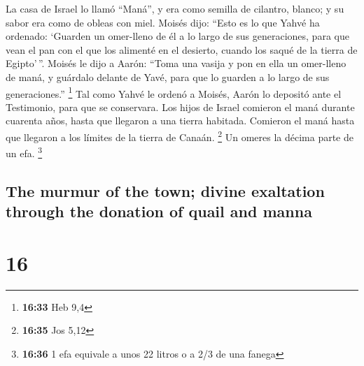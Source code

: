 \begin{paracol}{2}
 La casa de Israel lo llamó ``Maná'', y era como semilla
de cilantro, blanco; y su sabor era como de obleas con miel.
 Moisés dijo: ``Esto es lo que Yahvé ha ordenado:
`Guarden un omer-lleno de él a lo largo de sus generaciones, para que
vean el pan con el que los alimenté en el desierto, cuando los saqué de
la tierra de Egipto'\,''.  Moisés le dijo a Aarón: ``Toma
una vasija y pon en ella un omer-lleno de maná, y guárdalo delante de
Yavé, para que lo guarden a lo largo de sus generaciones.'' \footnote{\textbf{16:33}
  Heb 9,4}  Tal como Yahvé le ordenó a Moisés, Aarón lo
depositó ante el Testimonio, para que se conservara.  Los
hijos de Israel comieron el maná durante cuarenta años, hasta que
llegaron a una tierra habitada. Comieron el maná hasta que llegaron a
los límites de la tierra de Canaán. \footnote{\textbf{16:35} Jos 5,12}
 Un omeres la décima parte de un efa. \footnote{\textbf{16:36}
  1 efa equivale a unos 22 litros o a 2/3 de una fanega}

\switchcolumn
\begin{otherlanguage}{english}

\hypertarget{the-murmur-of-the-town-divine-exaltation-through-the-donation-of-quail-and-manna}{%
\subsection{The murmur of the town; divine exaltation through the
donation of quail and
manna}\label{the-murmur-of-the-town-divine-exaltation-through-the-donation-of-quail-and-manna}}

\hypertarget{section-31}{%
\section{16}\label{section-31}}


\end{otherlanguage}
\end{paracol}

